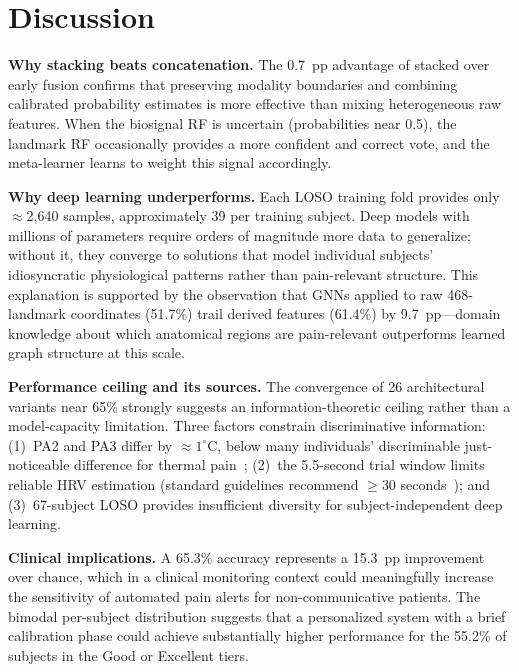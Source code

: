 \documentclass[sigconf]{acmart}
\begin{document}
\section{Discussion}
\label{sec:discussion}

\textbf{Why stacking beats concatenation.}
The 0.7~pp advantage of stacked over early fusion confirms that preserving
modality boundaries and combining calibrated probability estimates is more
effective than mixing heterogeneous raw features. When the biosignal RF is
uncertain (probabilities near 0.5), the landmark RF occasionally provides a
more confident and correct vote, and the meta-learner learns to weight this
signal accordingly.

\textbf{Why deep learning underperforms.}
Each LOSO training fold provides only $\approx$2,640 samples, approximately 39
per training subject. Deep models with millions of parameters require orders of
magnitude more data to generalize; without it, they converge to solutions that
model individual subjects' idiosyncratic physiological patterns rather than
pain-relevant structure. This explanation is supported by the observation that
GNNs applied to raw 468-landmark coordinates (51.7\%) trail derived features
(61.4\%) by 9.7~pp---domain knowledge about which anatomical regions are
pain-relevant outperforms learned graph structure at this scale.

\textbf{Performance ceiling and its sources.}
The convergence of 26 architectural variants near 65\% strongly suggests an
information-theoretic ceiling rather than a model-capacity limitation. Three
factors constrain discriminative information: (1)~PA2 and PA3 differ by
$\approx 1^\circ$C, below many individuals' discriminable just-noticeable
difference for thermal pain~\cite{yarnitsky1995}; (2)~the 5.5-second trial
window limits reliable HRV estimation (standard guidelines recommend
$\geq 30$ seconds~\cite{taskforce1996}); and (3)~67-subject LOSO provides
insufficient diversity for subject-independent deep learning.

\textbf{Clinical implications.}
A 65.3\% accuracy represents a 15.3~pp improvement over chance, which in a
clinical monitoring context could meaningfully increase the sensitivity of
automated pain alerts for non-communicative patients. The bimodal per-subject
distribution suggests that a personalized system with a brief calibration
phase could achieve substantially higher performance for the 55.2\% of subjects
in the Good or Excellent tiers.
\end{document}
